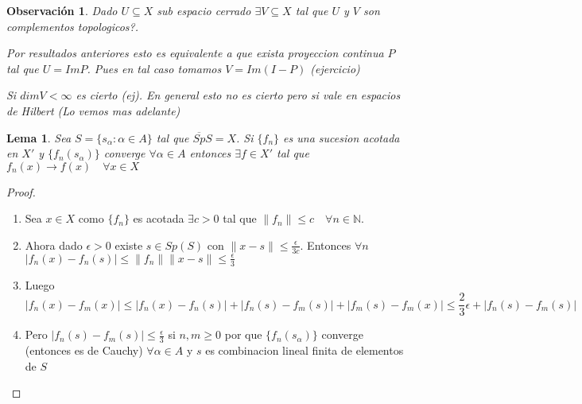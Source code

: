 \documentclass[10pt]{extarticle}
\theoremstyle{break}
\newtheorem{lemma}[theorem]{Lema}
\newtheorem*{remark}{Observación}
\theoremstyle{definition}
\begin{document}
\begin{remark}
	Dado $ U\subseteq X $ sub espacio cerrado $ \exists V\subseteq X $ tal que $ U $ y $ V $ son complementos topologicos?.

	Por resultados anteriores esto es equivalente a que exista proyeccion continua $ P $ tal que $ U=Im P $. Pues en tal caso tomamos $ V=Im(I-P) $ (ejercicio)

	Si $ dim V<\infty  $ es cierto (ej). En general esto no es cierto pero si vale en espacios de Hilbert (Lo vemos mas adelante)
\end{remark}

\begin{lemma}
	Sea $ S= \{s_{\alpha }: \alpha \in A\} $  tal que $ \overline{Sp}S=X $. Si $ \{f_{n} \} $ es una sucesion acotada en $ X' $ y $ \{f_{n} (s_{\alpha })\} $ converge $ \forall \alpha \in A  $ entonces $ \exists f\in X' $ tal que $ f_{n} (x)\longrightarrow f(x)\quad \forall x\in X  $  
\end{lemma}

\begin{proof}
	\begin{enumerate}
		\item Sea $ x\in X $ como $\{f_{n} \}$ es acotada $ \exists c>0 $ tal que $ \lVert f_{n}  \rVert \leq c \quad \forall n\in \mathbb{N} $.
		\item Ahora dado $ \epsilon >0 $ existe $ s\in Sp(S) $ con $ \lVert x-s \rVert \leq \frac{\epsilon }{3c} $. Entonces $ \forall n $ $ \lvert f_{n} (x)-f_{n} (s) \rvert \leq \lVert f_{n}  \rVert \lVert x-s \rVert \leq \frac{\epsilon }{3} $
		\item Luego $$\lvert f_{n} (x)-f_{m}(x) \rvert \leq \lvert f_{n} (x)-f_{n} (s) \rvert +\lvert f_{n} (s)-f_{m}(s) \rvert +\lvert f_{m}(s)-f_{m}(x) \rvert \leq \frac{2}{3}\epsilon +\lvert f_{n} (s)-f_{m}(s) \rvert $$ 
		\item Pero $ \lvert f_{n}(s)-f_{m}(s) \rvert \leq \frac{\epsilon }{3} $ si $ n,m\geq 0 $ por que $ \{f_{n}(s_{\alpha })\}$ converge (entonces es de Cauchy) $ \forall \alpha \in A  $ y $ s $ es combinacion lineal finita de elementos de $ S $     
	\end{enumerate}
\end{proof}
\end{document}
